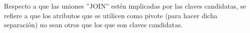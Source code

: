     \noindent Respecto a que las uniones ''JOIN'' estén implicadas por las claves candidatas, se refiere a que los atributos que se utilicen como pivote (para hacer dicha separación) no sean otros que los que son claves candidatas.\\
\begin{comment}
    \noindent  La única tabla que puede llegar a darnos problemas con esta forma normal es la misma que se analizó en la cuarta forma normal. Para analizar si esta tabla (\textbf{gmdl\_usuario\_logro\_curso}) cumple con esta forma tenemos que listar sus atributos.
    \begin{itemize}
        \item id
        \item gmdl\_id\_logro
        \item gmdl\_id\_usuario
        \item gmdl\_id\_curso
        \item cuando
    \end{itemize}
    
    \noindent  Las únicas 2 formas en las que se puede dividir la anterior tabla, conservando los mismos registros son las siguientes:
    \begin{multicols}{2}
    
    \noindent Utilizando como pivote el atributo ''id''. 
    \begin{itemize}
        \item A1(id, gmdl\_id\_usuario)
        \item A2(id, gmdl\_id\_logro)
        \item A3(id, gmdl\_id\_curso)
        \item A4(id, cuando)
    \end{itemize}
    \noindent \textbf{Nota:} Se pueden desarrollar distintas combinaciones con lo anterior, sin embargo, siempre se usa como pivote al atributo ''id'' es por eso que no se contemplan.
    \columnbreak
    
    \noindent Utilizando como pivote la llave candidata ''gmdl\_id\_usuario, gmdl\_id\_logro , gmdl\_id\_curso''.
    \begin{itemize}
        \item B1(id, gmdl\_id\_usuario, gmdl\_id\_logro , gmdl\_id\_curso)
        \item B2(gmdl\_id\_usuario, gmdl\_id\_logro , gmdl\_id\_curso, cuando)
    \end{itemize}
    
    \end{multicols}
\end{comment}    
    

